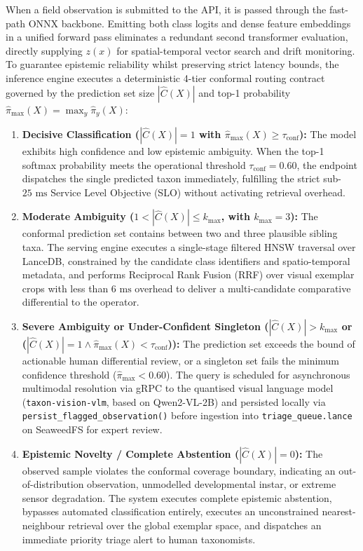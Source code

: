 When a field observation is submitted to the API, it is passed through the fast-path ONNX backbone. Emitting both class logits and dense feature embeddings in a unified forward pass eliminates a redundant second transformer evaluation, directly supplying $z(x)$ for spatial-temporal vector search and drift monitoring. To guarantee epistemic reliability whilst preserving strict latency bounds, the inference engine executes a deterministic 4-tier conformal routing contract governed by the prediction set size $|\hat{C}(X)|$ and top-1 probability $\hat{\pi}_{\max}(X) = \max_y \hat{\pi}_y(X)$:
\begin{enumerate}
    \item \textbf{Decisive Classification ($|\hat{C}(X)| = 1$ with $\hat{\pi}_{\max}(X) \ge \tau_{\text{conf}}$):} The model exhibits high confidence and low epistemic ambiguity. When the top-1 softmax probability meets the operational threshold $\tau_{\text{conf}} = 0.60$, the endpoint dispatches the single predicted taxon immediately, fulfilling the strict sub-$25\text{ ms}$ Service Level Objective (SLO) without activating retrieval overhead.
    \item \textbf{Moderate Ambiguity ($1 < |\hat{C}(X)| \le k_{\max}$, with $k_{\max} = 3$):} The conformal prediction set contains between two and three plausible sibling taxa. The serving engine executes a single-stage filtered HNSW traversal over LanceDB, constrained by the candidate class identifiers and spatio-temporal metadata, and performs Reciprocal Rank Fusion (RRF) over visual exemplar crops with less than $6\text{ ms}$ overhead to deliver a multi-candidate comparative differential to the operator.
    \item \textbf{Severe Ambiguity or Under-Confident Singleton ($|\hat{C}(X)| > k_{\max}$ or ($|\hat{C}(X)| = 1 \land \hat{\pi}_{\max}(X) < \tau_{\text{conf}}$)):} The prediction set exceeds the bound of actionable human differential review, or a singleton set fails the minimum confidence threshold ($\hat{\pi}_{\max} < 0.60$). The query is scheduled for asynchronous multimodal resolution via gRPC to the quantised visual language model (\texttt{taxon-vision-vlm}, based on Qwen2-VL-2B) and persisted locally via \nolinkurl{persist_flagged_observation()} before ingestion into \nolinkurl{triage_queue.lance} on SeaweedFS for expert review.
    \item \textbf{Epistemic Novelty / Complete Abstention ($|\hat{C}(X)| = 0$):} The observed sample violates the conformal coverage boundary, indicating an out-of-distribution observation, unmodelled developmental instar, or extreme sensor degradation. The system executes complete epistemic abstention, bypasses automated classification entirely, executes an unconstrained nearest-neighbour retrieval over the global exemplar space, and dispatches an immediate priority triage alert to human taxonomists.
\end{enumerate}

